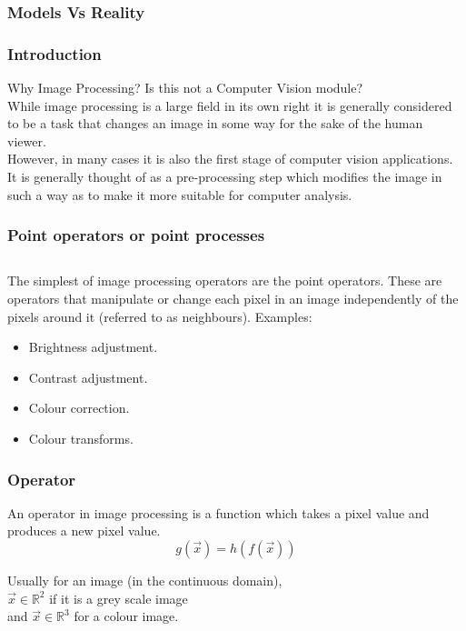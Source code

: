 \begin{frame}\frametitle{Models Vs Reality}
\end{frame}
\begin{frame}\frametitle{Introduction}

Why Image Processing? Is this not a Computer Vision module?\\
While image processing is a large field in its own right it is generally considered to be a task that changes an image in some way for the sake of the human viewer.\\
However, in many cases it is also the first stage of computer vision applications. \\It is generally thought of as a pre-processing step which modifies the image in such a way as to make it more suitable for computer analysis.
\end{frame}
\begin{frame}\frametitle{Point operators or point processes}
\subsection{}
The simplest of image processing operators are the point operators.
These are operators that manipulate or change each pixel in an image independently of the pixels around it (referred to as neighbours).
\vspace{0.5cm}
Examples:\\
\begin{itemize}
	\item Brightness adjustment.\\
	\item Contrast adjustment.\\
	\item Colour correction.\\
	\item Colour transforms.
\end{itemize}




\end{frame}
\begin{frame}\frametitle{Operator}
An operator in image processing is a function which takes a pixel value and produces a new pixel value.\\

\begin{equation}
    g(\vec{x}) = h(f(\vec{x}))
\end{equation}

Usually for an image (in the continuous domain),\\ $\vec{x} \in \mathbb{R}^2$ if it is a grey scale image\\
and $\vec{x} \in \mathbb{R}^3$ for a colour image.
\end{frame}
